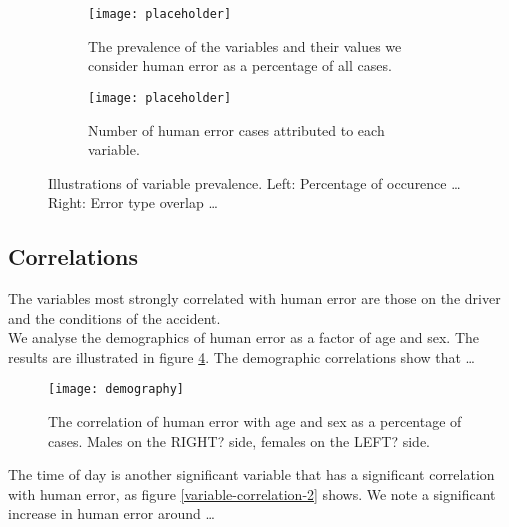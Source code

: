 \documentclass{article}
\theoremstyle{plain}
\theoremstyle{definition}
\theoremstyle{remark}
\begin{document}
\begin{figure}[ht]
	\vskip 0.2in
	\centering
		\begin{subfigure}[ht]{0.45\columnwidth}
			\texttt{[image: placeholder]}
			\caption{The prevalence of the variables and their values we consider human error as a percentage of all cases.}
			\label{prevalence-per-variable}
		\end{subfigure}
		\hfill
		\begin{subfigure}[ht]{0.45\columnwidth}
			\texttt{[image: placeholder]}
			\caption{Number of human error cases attributed to each variable.}
			\label{prevalence-multiple-occurence}
		\end{subfigure}
	\caption{Illustrations of variable prevalence. Left: Percentage of occurence \ldots Right: Error type overlap \ldots}
	\label{variable-prevalence}
	\vskip 0.2in
\end{figure}

\subsection{Correlations}
The variables most strongly correlated with human error are those on the driver and the conditions of the accident.
\\
We analyse the demographics of human error as a factor of age and sex. The results are illustrated in figure \ref{variable-correlation-1}. The demographic correlations show that \ldots

\begin{figure}[ht]
	\vskip 0.2in
	\begin{center}
		\centerline{\texttt{[image: demography]}}
		\caption{The correlation of human error with age and sex as a percentage of cases. Males on the RIGHT? side, females on the LEFT? side.}
		\label{variable-correlation-1}
	\end{center}
	\vskip -0.2in
\end{figure}

The time of day is another significant variable that has a significant correlation with human error, as figure \ref{variable-correlation-2} shows. We note a significant increase in human error around \ldots
\end{document}
